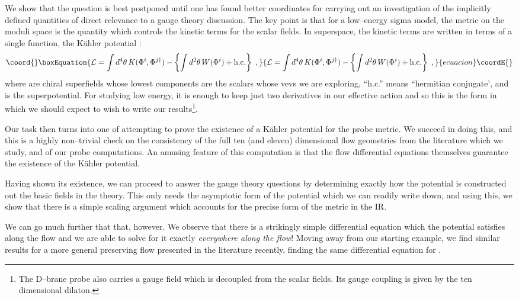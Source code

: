 \documentclass[a4paper,12pt]{article}
\begin{document}
We show that the question is best postponed until one has found better
coordinates for carrying out an investigation of the implicitly
defined quantities of direct relevance to a gauge theory discussion.
The key point is that for a low--energy sigma model, the metric on the
moduli space is the quantity which controls the kinetic terms for the
scalar fields. In superspace, the kinetic terms are written in terms
of a single function, the K\"ahler potential \coordHE{}:
\begin{equation}\coord{}\boxEquation{
{\cal L}=\int d^4\theta \, K(\Phi^i,\Phi^{j\dagger})-\left\{\int d^2\theta\,
 W(\Phi^i)
+{\rm h.c.}\right\} \ ,
}{
{\cal L}=\int d^4\theta \, K(\Phi^i,\Phi^{j\dagger})-\left\{\int d^2\theta\,
 W(\Phi^i)
+{\rm h.c.}\right\} \ ,
}{ecuacion}\coordE{}\end{equation}
where \coordHE{} are chiral superfields whose lowest components are the
scalars whose vevs we are exploring, ``h.c.'' means ``hermitian
conjugate', and \coordHE{} is the superpotential. For studying low
energy, it is enough to keep just two derivatives in our effective
action and so this is the form in which we should expect to wish to
write our results\footnote{The D--brane probe also carries a \coordHE{}
  gauge field which is decoupled from the scalar fields.  Its gauge
  coupling is given by the ten dimensional dilaton.}.

Our task then turns into one of attempting to prove the existence of a
K\"ahler potential for the probe metric. We succeed in doing this, and
this is a highly non--trivial check on the consistency of the full ten
(and eleven) dimensional flow geometries from the literature which we
study, and of our probe computations. An amusing feature of this
computation is that the flow differential equations themselves
guarantee the existence of the K\"ahler potential. 

Having shown its existence, we can proceed to answer the gauge theory
questions by determining exactly how the potential is constructed out
the basic fields in the theory. This only needs the asymptotic form of
the potential which we can readily write down, and using this, we show
that there is a simple scaling argument which accounts for the precise
form of the metric in the IR.

We can go much further that that, however. We observe that there is a
strikingly simple differential equation which the potential satisfies
along the flow and we are able to solve for it exactly {\it everywhere
  along the flow}!  Moving away from our starting example, we find
similar results for a more general \coordHE{} preserving flow
presented in the literature recently\cite{warnernew}, finding the same
differential equation for \coordHE{}.
\end{document}

